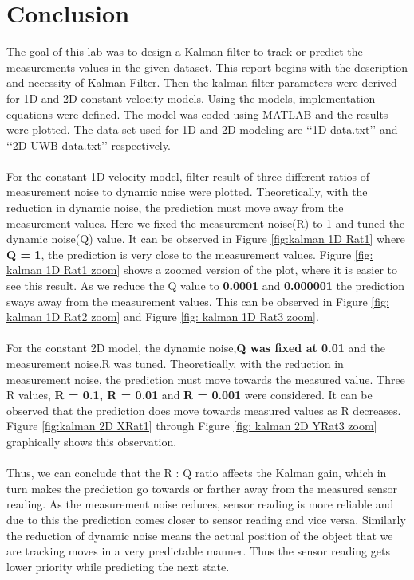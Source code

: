 \documentclass[12pt]{article}
\begin{document}
\section{Conclusion}
The goal of this lab was to design a Kalman filter to track or predict the measurements values in the given dataset. This report begins with the description and necessity of Kalman Filter. Then the kalman filter parameters were derived for 1D and 2D constant velocity models. Using the models, implementation equations were defined. The model was coded using MATLAB and the results were plotted. The data-set used for 1D and 2D modeling are \lq\lq{}1D-data.txt\rq\rq{} and \lq\lq{}2D-UWB-data.txt\rq\rq{} respectively. \\
\\
For the constant 1D velocity model, filter result of three different ratios of measurement noise to dynamic noise were plotted. Theoretically, with the reduction in dynamic noise, the prediction must move away from the measurement values. Here we fixed the measurement noise(R) to 1 and tuned the dynamic noise(Q) value. It can be observed in Figure \ref{fig:kalman 1D Rat1} where \textbf{Q = 1}, the prediction is very close to the measurement values. Figure \ref{fig: kalman 1D Rat1 zoom} shows a zoomed version of the plot, where it is easier to see this result. As we reduce the Q value to \textbf{0.0001} and \textbf{0.000001} the prediction sways away from the measurement values. This can be observed in Figure \ref{fig: kalman 1D Rat2 zoom} and Figure \ref{fig: kalman 1D Rat3 zoom}.\\
\\
For the constant 2D model, the dynamic noise,\textbf{Q was fixed at 0.01} and the measurement noise,R was tuned. Theoretically, with the reduction in measurement noise, the prediction must move towards the measured value. Three R values, \textbf{R = 0.1, R = 0.01 } and \textbf{R = 0.001} were considered. It can be observed that the prediction does move towards measured values as R decreases. Figure \ref{fig:kalman 2D XRat1} through Figure \ref{fig: kalman 2D YRat3 zoom} graphically shows this observation. \\
\\
Thus, we can conclude that the R : Q ratio affects the Kalman gain, which in turn makes the prediction go towards or farther away from the measured sensor reading. As the measurement noise reduces, sensor reading is more reliable and due to this the prediction comes closer to sensor reading and vice versa. Similarly the reduction of dynamic noise means the actual position of the object that we are tracking moves in a very predictable manner. Thus the sensor reading gets lower priority while predicting the next state. 
\end{document}
